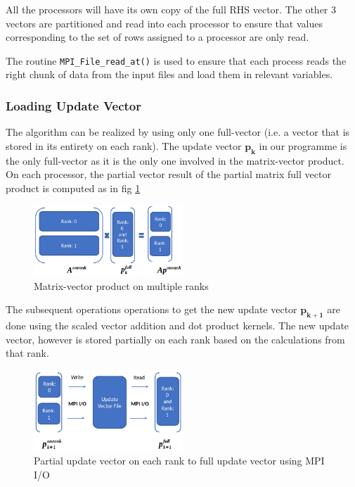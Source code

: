 \documentclass[sigplan,screen]{acmart}
\begin{document}
All the processors will have its own copy of the full RHS vector. The other 3 vectors are partitioned and read into each processor to ensure that values corresponding to the set of rows assigned to a processor are only read. 

The routine \texttt{MPI\_File\_read\_at()} is used to ensure that each process reads the right chunk of data from the input files and load them in relevant variables.

\subsubsection{Loading Update Vector}
The algorithm can be realized by using only one full-vector (i.e. a vector that is stored in its entirety on each rank). The update vector $\mathbf{p_k}$ in our programme is the only full-vector as it is the only one involved in the matrix-vector product. On each processor, the partial vector result of the partial matrix full vector product is computed as in fig \ref{fig2}
\begin{figure}[H]
	\begin{center}
		\includegraphics[width=0.5\textwidth]{plots/mpio_Ap.png}
	\end{center}
	\caption{Matrix-vector product on multiple ranks}
	\label{fig2} 
\end{figure}
The subsequent operations operations to get the new update vector $\mathbf{p_{k+1}}$ are done using the scaled vector addition and dot product kernels. The new update vector, however is stored partially on each rank based on the calculations from that rank.
\begin{figure}[H]
	\begin{center}
		\includegraphics[width=0.5\textwidth]{plots/mpio_pupdate.png}
	\end{center}
	\caption{Partial update vector on each rank to full update vector using MPI I/O}
	\label{fig3} 
\end{figure}
\end{document}
